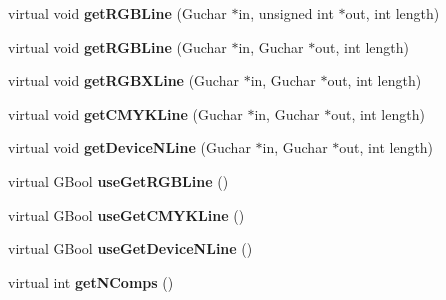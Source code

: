 \begin{DoxyCompactItemize}
\item 
\mbox{\label{class_gfx_indexed_color_space_af43aebc73a577de47104e477b44d0070}} 
virtual void {\bfseries get\+R\+G\+B\+Line} (Guchar $\ast$in, unsigned int $\ast$out, int length)
\item 
\mbox{\label{class_gfx_indexed_color_space_a9743b573567f824305a935be0e3a7239}} 
virtual void {\bfseries get\+R\+G\+B\+Line} (Guchar $\ast$in, Guchar $\ast$out, int length)
\item 
\mbox{\label{class_gfx_indexed_color_space_af0e85b96e97a8814f4782729ac99ae0d}} 
virtual void {\bfseries get\+R\+G\+B\+X\+Line} (Guchar $\ast$in, Guchar $\ast$out, int length)
\item 
\mbox{\label{class_gfx_indexed_color_space_acafae2124ad0cf991a7d196494e1a6d0}} 
virtual void {\bfseries get\+C\+M\+Y\+K\+Line} (Guchar $\ast$in, Guchar $\ast$out, int length)
\item 
\mbox{\label{class_gfx_indexed_color_space_ae864820544eb1f6b14d477717a4b54ba}} 
virtual void {\bfseries get\+Device\+N\+Line} (Guchar $\ast$in, Guchar $\ast$out, int length)
\item 
\mbox{\label{class_gfx_indexed_color_space_a81f48c04216a3b869c75c951f584b881}} 
virtual G\+Bool {\bfseries use\+Get\+R\+G\+B\+Line} ()
\item 
\mbox{\label{class_gfx_indexed_color_space_a10fb509ee8a65aee8b7d2a5c1c26804f}} 
virtual G\+Bool {\bfseries use\+Get\+C\+M\+Y\+K\+Line} ()
\item 
\mbox{\label{class_gfx_indexed_color_space_a335ed67acbfd0ecae921ac0e718e1bbd}} 
virtual G\+Bool {\bfseries use\+Get\+Device\+N\+Line} ()
\item 
\mbox{\label{class_gfx_indexed_color_space_a6493bb274d1c015e86a53d136403a7f2}} 
virtual int {\bfseries get\+N\+Comps} ()
\item 
\mbox{\label{class_gfx_indexed_color_space_a0fcc6fe702131335460a5e33c42f3c11}} 

\end{DoxyCompactItemize}
